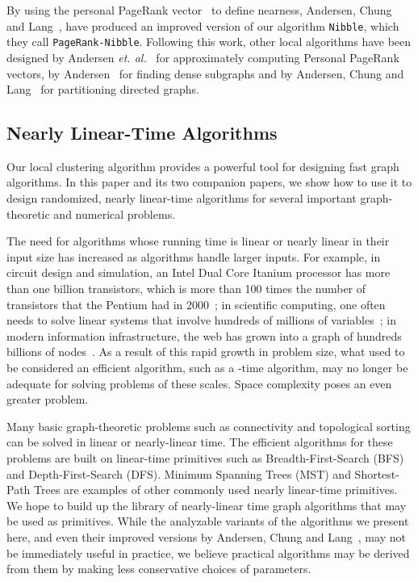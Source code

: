 \documentclass[11pt]{article}
\begin{document}
By using the personal PageRank vector~\cite{PageRank}
  to define nearness, Andersen, Chung and Lang~\cite{AndersenChungLang}, 
  have produced an improved version of our algorithm \texttt{Nibble},
  which they call \texttt{PageRank-Nibble}.
Following this work, other local algorithms have been designed by
  Andersen \textit{et. al.}~\cite{AndersenPageRank} for
  approximately computing Personal PageRank vectors, by
  Andersen~\cite{AndersenDense} for finding dense subgraphs
  and by Andersen, Chung and Lang~\cite{AndersenChungLang2} for partitioning
  directed graphs.

\subsection{Nearly Linear-Time Algorithms}

Our local clustering algorithm provides a powerful tool for
  designing fast graph algorithms.
In this paper and its two companion papers, we 
  show how to use it to design randomized, nearly linear-time
  algorithms for several important graph-theoretic and
  numerical problems.

The need for algorithms whose running time is
  linear or nearly linear in their input size
  has increased as algorithms handle larger inputs.
For example, in circuit design and simulation,
  an Intel Dual Core Itanium processor has more than
  one billion transistors, 
  which is  more than 100 times the number of
  transistors that the Pentium had in 2000~\cite{IntelMooresLaw};
  in scientific computing, one often needs to solve linear
  systems that involve hundreds of millions of variables~\cite{LargeScaleScientificComputing};
 in modern information infrastructure, the web has grown into
  a graph of hundreds billions of nodes~\cite{IndexableWeb2005}.
As a result of this rapid growth in problem size, what used to
  be considered an efficient algorithm, such as
  a -time algorithm, may no longer be adequate for
  solving problems of these scales.
Space complexity poses an even greater problem.

Many basic graph-theoretic problems such as connectivity
  and topological sorting can be solved in linear or nearly-linear time.
The efficient algorithms for these problems are built on
  linear-time primitives such as Breadth-First-Search
  (BFS) and Depth-First-Search (DFS).
Minimum Spanning Trees (MST) and Shortest-Path Trees are
  examples of other commonly used nearly linear-time primitives.
We hope to build up the library of nearly-linear time
  graph algorithms that may be used as primitives.
While the analyzable variants of the 
  algorithms we present here, and even their improved versions
  by Andersen, Chung and Lang~\cite{AndersenChungLang}, may not be
  immediately useful in practice, we 
  believe practical algorithms may be derived from them by
  making less conservative choices of parameters.
\end{document}
